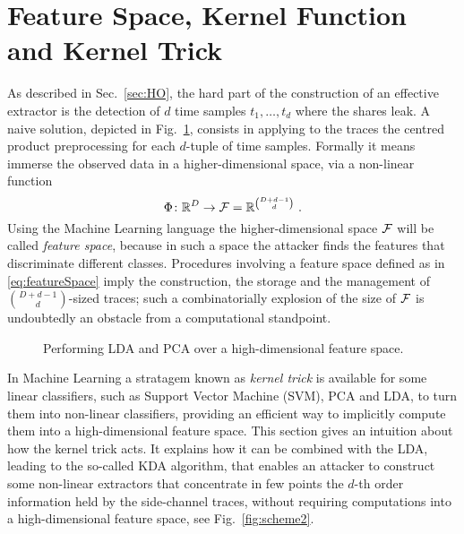 \section{Feature Space, Kernel Function and Kernel Trick}


As described in Sec.~\ref{sec:HO}, the hard part of the construction of an effective extractor  is the detection of $d$ time samples $t_1,\dots,t_d$ where the shares leak. A naive solution, depicted in Fig.~\ref{fig:scheme1}, consists in applying to the traces the centred product preprocessing for each $d$-tuple of time samples. Formally it means immerse the observed data in a higher-dimensional space, via a non-linear function
\begin{equation}\label{eq:featureSpace}
\Phi \colon \mathbb{R}^D \rightarrow \mathcal{F} = \mathbb{R}^{{D+d-1}\choose{d}} \mbox{ .}
\end{equation}
 Using the Machine Learning language the higher-dimensional space $\mathcal{F}$ will be called \emph{feature space}, because in such a space the attacker finds the features that discriminate different classes. Procedures involving a feature space defined as in \eqref{eq:featureSpace} imply the construction, the storage and the management of ${D+d-1}\choose{d}$-sized traces; such a combinatorially explosion of the size of $\mathcal{F}$ is undoubtedly an obstacle from a computational standpoint.
 
\begin{figure}
\centering
{
}
\caption{Performing LDA and PCA over a high-dimensional feature space.}\label{fig:scheme1}
\end{figure} 
 
 In Machine Learning a stratagem known as \emph{kernel trick} is available for some linear classifiers, such as Support Vector Machine (SVM), PCA and LDA, to turn them into non-linear classifiers, providing an efficient way to implicitly compute them into a high-dimensional feature space. This section gives an intuition about how the kernel trick acts. It explains how it can be combined with the LDA, leading to the so-called KDA algorithm, that enables an attacker to construct some non-linear extractors that concentrate in few points the $d$-th order information held by the side-channel traces, without requiring computations into a high-dimensional feature space, see Fig.~\ref{fig:scheme2}. 

